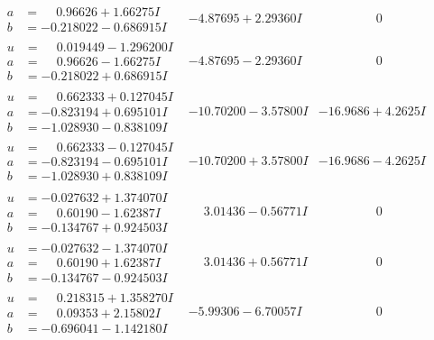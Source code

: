 \documentclass[1p]{elsarticle_modified}
\theoremstyle{definition}
\begin{document}
$$\begin{array}{c|c|c}
\begin{aligned}
a &= \phantom{-}0.96626 + 1.66275 I \\
b &= -0.218022 - 0.686915 I\end{aligned}
 & -4.87695 + 2.29360 I & \phantom{-0.000000 } 0 \\ \hline\begin{aligned}
u &= \phantom{-}0.019449 - 1.296200 I \\
a &= \phantom{-}0.96626 - 1.66275 I \\
b &= -0.218022 + 0.686915 I\end{aligned}
 & -4.87695 - 2.29360 I & \phantom{-0.000000 } 0 \\ \hline\begin{aligned}
u &= \phantom{-}0.662333 + 0.127045 I \\
a &= -0.823194 + 0.695101 I \\
b &= -1.028930 - 0.838109 I\end{aligned}
 & -10.70200 - 3.57800 I & -16.9686 + 4.2625 I \\ \hline\begin{aligned}
u &= \phantom{-}0.662333 - 0.127045 I \\
a &= -0.823194 - 0.695101 I \\
b &= -1.028930 + 0.838109 I\end{aligned}
 & -10.70200 + 3.57800 I & -16.9686 - 4.2625 I \\ \hline\begin{aligned}
u &= -0.027632 + 1.374070 I \\
a &= \phantom{-}0.60190 - 1.62387 I \\
b &= -0.134767 + 0.924503 I\end{aligned}
 & \phantom{-}3.01436 - 0.56771 I & \phantom{-0.000000 } 0 \\ \hline\begin{aligned}
u &= -0.027632 - 1.374070 I \\
a &= \phantom{-}0.60190 + 1.62387 I \\
b &= -0.134767 - 0.924503 I\end{aligned}
 & \phantom{-}3.01436 + 0.56771 I & \phantom{-0.000000 } 0 \\ \hline\begin{aligned}
u &= \phantom{-}0.218315 + 1.358270 I \\
a &= \phantom{-}0.09353 + 2.15802 I \\
b &= -0.696041 - 1.142180 I\end{aligned}
 & -5.99306 - 6.70057 I & \phantom{-0.000000 } 0 \\ \hline\begin{aligned}

\end{aligned}
\end{array}$$
\end{document}
